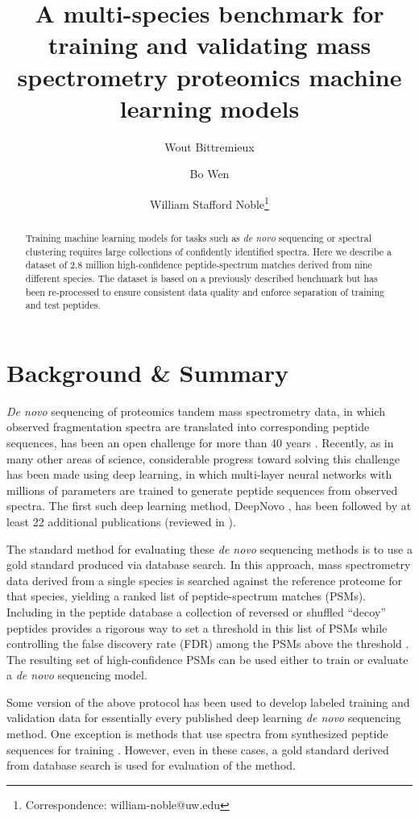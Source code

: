 \documentclass{article}
\title{A multi-species benchmark for training and validating mass spectrometry proteomics machine learning models}
\author[1]{Wout Bittremieux}
\author[2]{Bo Wen}
\author[2,3]{William Stafford Noble\footnote{Correspondence: william-noble@uw.edu}}
\affil[1]{Department of Computer Science, University of Antwerp, Belgium}
\affil[2]{Department of Genome Sciences, University of Washington, Seattle, WA, USA}
\affil[3]{Paul G.\ Allen School of Computer Science and Engineering, University of Washington, Seattle, WA, USA}
\date{}
\begin{document}
\maketitle

\begin{abstract}
  Training machine learning models for tasks such as \textit{de novo} sequencing or spectral clustering requires large collections of confidently identified spectra.
  Here we describe a dataset of 2.8 million high-confidence peptide-spectrum matches derived from nine different species.
  The dataset is based on a previously described benchmark but has been re-processed to ensure consistent data quality and enforce separation of training and test peptides.
\end{abstract}

\section*{Background \& Summary}

\textit{De novo} sequencing of proteomics tandem mass spectrometry data, in which observed fragmentation spectra are translated into corresponding peptide sequences, has been an open challenge for more than 40 years \cite{sakurai1984paas}.
Recently, as in many other areas of science, considerable progress toward solving this challenge has been made using deep learning, in which multi-layer neural networks with millions of parameters are trained to generate peptide sequences from observed spectra.
The first such deep learning method, DeepNovo \cite{tran2017denovo}, has been followed by at least 22 additional publications (reviewed in \cite{bittremieux2024deep}).

The standard method for evaluating these \textit{de novo} sequencing methods is to use a gold standard produced via database search.
In this approach, mass spectrometry data derived from a single species is searched against the reference proteome for that species, yielding a ranked list of peptide-spectrum matches (PSMs).
Including in the peptide database a collection of reversed or shuffled ``decoy'' peptides provides a rigorous way to set a threshold in this list of PSMs while controlling the false discovery rate (FDR) among the PSMs above the threshold \cite{elias2007target}.
The resulting set of high-confidence PSMs can be used either to train or evaluate a \textit{de novo} sequencing model.

Some version of the above protocol has been used to develop labeled training and validation data for essentially every published deep learning \textit{de novo} sequencing method.
One exception is methods that use spectra from synthesized peptide sequences for training \cite{karunratanakul2019uncovering, eloff2023denovo, liu2023accurate}.
However, even in these cases, a gold standard derived from database search is used for evaluation of the method.
\end{document}

